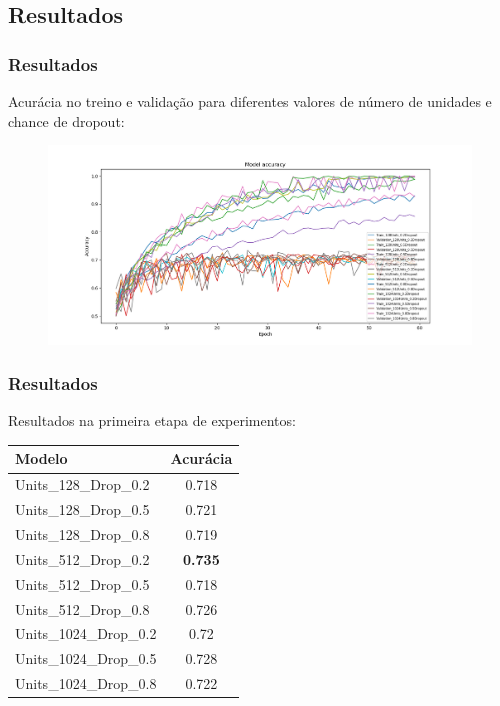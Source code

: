 \documentclass{beamer}
\begin{document}
\subsection{Resultados}
\begin{frame}
\frametitle{Resultados}
    Acurácia no treino e validação para diferentes valores de número de unidades e chance de dropout:
    
    \begin{figure}
    \includegraphics[width=\linewidth]{figs/curve.png}
    \end{figure}
\end{frame}


\begin{frame}
\frametitle{Resultados}
    Resultados na primeira etapa de experimentos:
    
    \begin{table}
    \small
    \centering
    \begin{tabular}{|l|c|}
        \hline
        Modelo & Acurácia \\
        \hline
        Units\_128\_Drop\_0.2 & 0.718 \\
        Units\_128\_Drop\_0.5 & 0.721 \\
        Units\_128\_Drop\_0.8 & 0.719 \\
        Units\_512\_Drop\_0.2 & \textbf{0.735} \\
        Units\_512\_Drop\_0.5 & 0.718 \\
        Units\_512\_Drop\_0.8 & 0.726 \\
        Units\_1024\_Drop\_0.2 & 0.72 \\
        Units\_1024\_Drop\_0.5 & 0.728 \\
        Units\_1024\_Drop\_0.8 & 0.722 \\
        \hline
    \end{tabular}
\end{table}
\end{frame}
\end{document}
